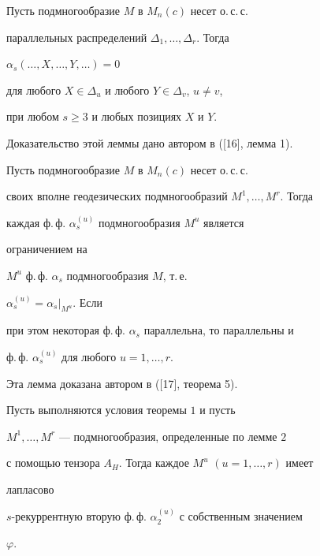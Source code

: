 \begin{lem} Пусть подмногообразие $M$ в $M_n(c)$ несет о.\,с.\,с.


параллельных распределений $\Delta_1,\dotsc,\Delta_r$. Тогда


$\alpha_s(\dotsc,X,\dotsc,Y,\dotsc)=0$


для любого $X\in\Delta_u$ и любого $Y\in\Delta_v$, $u\ne v$,


при любом $s\ge 3$ и любых позициях $X$ и $Y$.


\end{lem}





Доказательство этой леммы дано автором в ([16], лемма 1).





\begin{lem} Пусть подмногообразие $M$ в $M_n(c)$ несет о.\,с.\,с.


своих вполне геодезических подмногообразий $M^1,\dotsc,M^r$. Тогда


каждая ф.\,ф. $\alpha^{(u)}_s$ подмногообразия $M^u$ является


ограничением на


$M^u$ ф.\,ф. $\alpha_s$ подмногообразия $M$, т.\,е.


$\alpha^{(u)}_s=\alpha_s|_{M^u}$. Если


при этом некоторая ф.\,ф. $\alpha_s$ параллельна, то параллельны и


ф.\,ф. $\alpha^{(u)}_s$ для любого $u=1,\dotsc,r$.


\end{lem}





Эта лемма доказана автором в ([17], теорема 5).





\begin{lem} Пусть выполняются условия теоремы $1$ и пусть


$M^1,\dotsc,M^r$ --- подмногообразия, определенные по лемме $2$


с помощью тензора $A_H$. Тогда каждое $M^u$ $(u=1,\dotsc,r)$ имеет


лапласово


$s$-рекуррентную вторую ф.\,ф. $\alpha^{(u)}_2$ с собственным значением


$\varphi$.


\end{lem}





